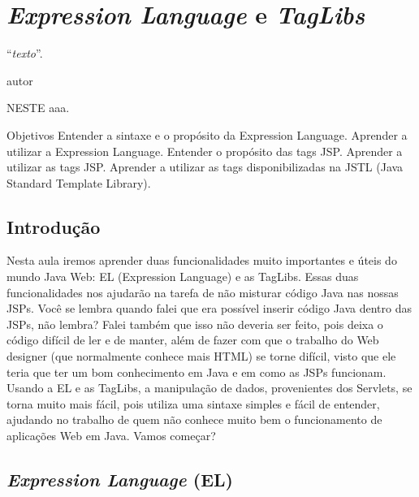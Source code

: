 \chapter{\textit{Expression Language} e \textit{TagLibs}}
\epigraph{``\textit{texto}''.}{autor}

\lettrine[lines=4, lhang=0.1, lraise=0, loversize=0.2, findent=0.1em]{\textcolor{corAzulTema}{N}}{ESTE} aaa.

Objetivos
Entender a sintaxe e o propósito da Expression Language.
Aprender a utilizar a Expression Language.
Entender o propósito das tags JSP.
Aprender a utilizar as tags JSP.
Aprender a utilizar as tags disponibilizadas na JSTL (Java Standard Template Library).


\section{Introdução}

Nesta aula iremos aprender duas funcionalidades muito importantes e úteis do mundo Java Web: EL (Expression Language) e as TagLibs. Essas duas funcionalidades nos ajudarão na tarefa de não misturar código Java nas nossas JSPs. Você se lembra quando falei que era possível inserir código Java dentro das JSPs, não lembra? Falei também que isso não deveria ser feito, pois deixa o código difícil de ler e de manter, além de fazer com que o trabalho do Web designer (que normalmente conhece mais HTML) se torne difícil, visto que ele teria que ter um bom conhecimento em Java e em como as JSPs funcionam. Usando a EL e as TagLibs, a manipulação de dados, provenientes dos Servlets, se torna muito mais fácil, pois utiliza uma sintaxe simples e fácil de entender, ajudando no trabalho de quem não conhece muito bem o funcionamento de aplicações Web em Java. Vamos começar?

\section{\textit{Expression Language} (EL)}

